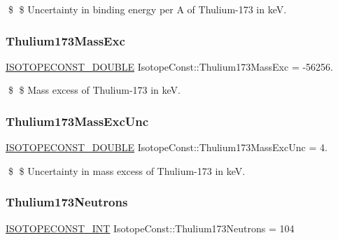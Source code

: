 \$ \$ Uncertainty in binding energy per A of Thulium-\/173 in keV. \mbox{\label{group___isotope_const-_thulium-_tm173_ga52a7ffa2b4cc8357243beb824a3330f1}} 
\subsubsection{\texorpdfstring{Thulium173\+Mass\+Exc}{Thulium173MassExc}}
{\footnotesize\ttfamily \mbox{\hyperlink{group___isotope_const-_macros_ga8f45a7272ce02c0b4c65c44636ed719a}{I\+S\+O\+T\+O\+P\+E\+C\+O\+N\+S\+T\+\_\+\+D\+O\+U\+B\+LE}} Isotope\+Const\+::\+Thulium173\+Mass\+Exc = -\/56256.}

\$ \$ Mass excess of Thulium-\/173 in keV. \mbox{\label{group___isotope_const-_thulium-_tm173_ga6409a4e2c141d36dd03c91b7ac477519}} 
\subsubsection{\texorpdfstring{Thulium173\+Mass\+Exc\+Unc}{Thulium173MassExcUnc}}
{\footnotesize\ttfamily \mbox{\hyperlink{group___isotope_const-_macros_ga8f45a7272ce02c0b4c65c44636ed719a}{I\+S\+O\+T\+O\+P\+E\+C\+O\+N\+S\+T\+\_\+\+D\+O\+U\+B\+LE}} Isotope\+Const\+::\+Thulium173\+Mass\+Exc\+Unc = 4.}

\$ \$ Uncertainty in mass excess of Thulium-\/173 in keV. \mbox{\label{group___isotope_const-_thulium-_tm173_gaefd79f502e4828ecd6bbb4e08291b512}} 
\subsubsection{\texorpdfstring{Thulium173\+Neutrons}{Thulium173Neutrons}}
{\footnotesize\ttfamily \mbox{\hyperlink{group___isotope_const-_macros_ga5f18360b3e99483a35c32d789e62621c}{I\+S\+O\+T\+O\+P\+E\+C\+O\+N\+S\+T\+\_\+\+I\+NT}} Isotope\+Const\+::\+Thulium173\+Neutrons = 104}

